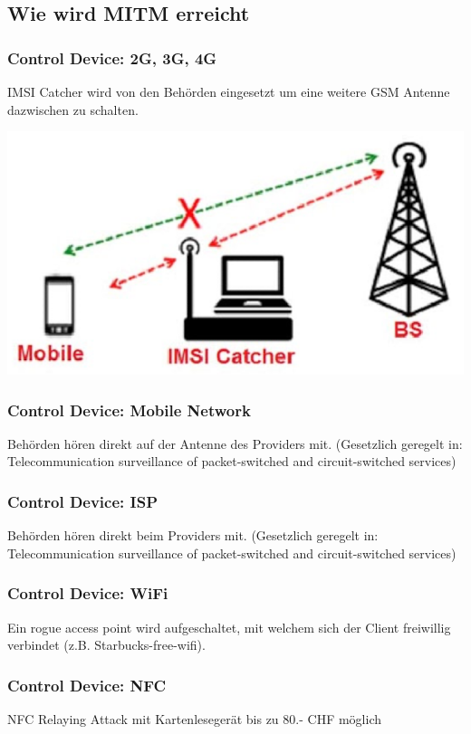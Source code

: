 \subsection{Wie wird MITM erreicht}

\subsubsection{Control Device: 2G, 3G, 4G}
IMSI Catcher wird von den Behörden eingesetzt um eine weitere GSM Antenne dazwischen zu schalten.
\begin{center}
    \vspace{-8pt}
    \includegraphics[width=.6\linewidth]{./img/09-mitm/imsi}
    \vspace{-8pt}
\end{center}

\subsubsection{Control Device: Mobile Network}
Behörden hören direkt auf der Antenne des Providers mit. (Gesetzlich geregelt in: Telecommunication surveillance of packet-switched and circuit-switched services)

\subsubsection{Control Device: ISP}
Behörden hören direkt beim Providers mit. (Gesetzlich geregelt in: Telecommunication surveillance of packet-switched and circuit-switched services)

\subsubsection{Control Device: WiFi}
Ein rogue access point wird aufgeschaltet, mit welchem sich der Client freiwillig verbindet (z.B. Starbucks-free-wifi).

\subsubsection{Control Device: NFC}
NFC Relaying Attack mit Kartenlesegerät bis zu 80.- CHF möglich

